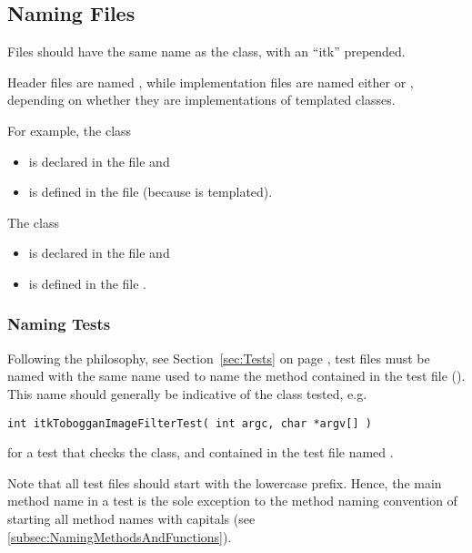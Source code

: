 \subsection{Naming Files}
\label{subsec:NamingFiles}

Files should have the same name as the class, with an ``itk'' prepended.

Header files are named , while implementation files are named either
 or , depending on whether they are implementations of
templated classes.

For example, the class 
\begin{itemize}
\item is declared in the file  and
\item is defined in the file  (because 
is templated).
\end{itemize}

The class 
\begin{itemize}
\item is declared in the file  and
\item is defined in the file .
\end{itemize}


\subsubsection{Naming Tests}
\label{subsubsec:NamingTests}

Following the  philosophy, see Section~\ref{sec:Tests} on
page \pageref{sec:Tests}, test files must be named with the same name used to
name the  method contained in the test file (). This
name should generally be indicative of the class tested, e.g.
\small
\begin{verbatim}
int itkTobogganImageFilterTest( int argc, char *argv[] )
\end{verbatim}
\normalsize

for a test that checks the  class, and contained
in the test file named .

Note that all test files should start with the lowercase  prefix.
Hence, the main method name in a test is the sole exception to the method naming
convention of starting all method names with capitals (see
\ref{subsec:NamingMethodsAndFunctions}).

